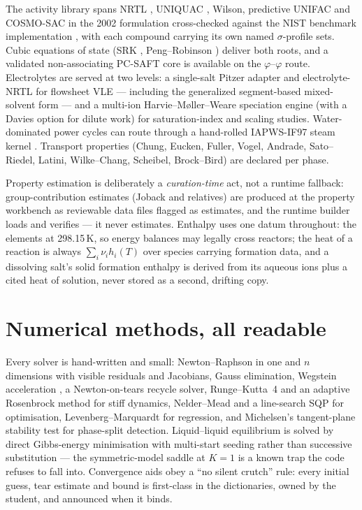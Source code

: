 \documentclass[11pt,a4paper]{article}
\begin{document}
The activity library spans NRTL \citep{renon1968}, UNIQUAC
\citep{abrams1975}, Wilson, predictive UNIFAC \citep{fredenslund1975} and
COSMO-SAC in the 2002 formulation \citep{lin2002} cross-checked against
the NIST benchmark implementation \citep{bell2019}, with each compound
carrying its own named $\sigma$-profile sets.  Cubic equations of state
(SRK \citep{soave1972}, Peng--Robinson \citep{peng1976}) deliver both
roots, and a validated non-associating PC-SAFT core \citep{gross2001} is
available on the $\varphi$--$\varphi$ route.  Electrolytes are served at
two levels: a single-salt Pitzer adapter \citep{pitzer1973} and
electrolyte-NRTL \citep{chen1986} for flowsheet VLE --- including the
generalized segment-based mixed-solvent form \citep{chen2004} --- and a
multi-ion Harvie--M{\o}ller--Weare speciation engine \citep{harvie1984}
(with a Davies option for dilute work) for saturation-index and scaling
studies.  Water-dominated power cycles can route through a hand-rolled
IAPWS-IF97 steam kernel \citep{wagner2000}.  Transport properties (Chung,
Eucken, Fuller, Vogel, Andrade, Sato--Riedel, Latini, Wilke--Chang,
Scheibel, Brock--Bird) are declared per phase.

Property estimation is deliberately a \emph{curation-time} act, not a
runtime fallback: group-contribution estimates (Joback and relatives) are
produced at the property workbench as reviewable data files flagged as
estimates, and the runtime builder loads and verifies --- it never
estimates.  Enthalpy uses one datum throughout: the elements at
298.15\,K, so energy balances may legally cross reactors; the heat of a
reaction is always $\sum_i\nu_ih_i(T)$ over species carrying formation
data, and a dissolving salt's solid formation enthalpy is derived from
its aqueous ions plus a cited heat of solution, never stored as a second,
drifting copy.

\section{Numerical methods, all readable}

Every solver is hand-written and small: Newton--Raphson in one and $n$
dimensions with visible residuals and Jacobians, Gauss elimination,
Wegstein acceleration \citep{wegstein1958}, a Newton-on-tears recycle
solver, Runge--Kutta~4 and an adaptive Rosenbrock method for stiff
dynamics, Nelder--Mead \citep{nelder1965} and a line-search SQP for
optimisation, Levenberg--Marquardt \citep{marquardt1963} for regression,
and Michelsen's tangent-plane stability test \citep{michelsen1982} for
phase-split detection.  Liquid--liquid equilibrium is solved by direct
Gibbs-energy minimisation with multi-start seeding rather than
successive substitution --- the symmetric-model saddle at $K=1$ is a
known trap the code refuses to fall into.  Convergence aids obey a
``no silent crutch'' rule: every initial guess, tear estimate and bound
is first-class in the dictionaries, owned by the student, and announced
when it binds.
\end{document}
